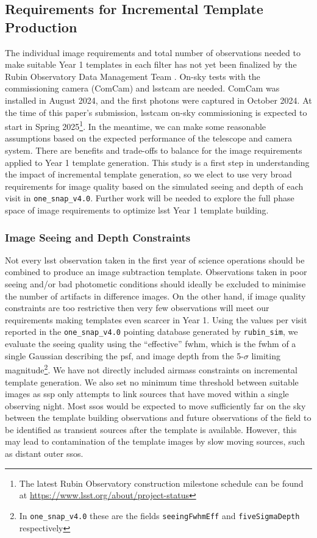 \documentclass[preprintm,linenumbers]{aastex631}
\newcommand{\baseline}{\texttt{one\_snap\_v4.0}\xspace}
\newcommand{\rubinsim}{\texttt{rubin\_sim}\xspace}
\begin{document}
	\subsection{Requirements for Incremental Template Production}
	The individual image requirements and total number of observations needed to make suitable Year 1 templates in each filter has not yet been finalized by the Rubin Observatory Data Management Team \citep{DMTN-107,RTN-011}. 
 On-sky tests with the commissioning camera (ComCam) and \gls*{lsstcam} are needed. 
 ComCam was installed in August 2024, and the first photons were captured in October 2024. 
 At the time of this paper's submission, \gls*{lsstcam} on-sky commissioning is expected to start in Spring 2025\footnote{The latest Rubin Observatory construction milestone schedule can be found at \url{https://www.lsst.org/about/project-status}}. 
 In the meantime, we can make some reasonable assumptions based on the expected performance of the telescope and camera system. 
 There are benefits and trade-offs to balance for the image requirements applied to Year 1 template generation. This study is a first step in understanding the impact of incremental template generation,  so we elect to use very broad requirements for image quality based on the simulated seeing and depth of each visit in \baseline. 
 Further work will be needed to explore the full phase space of image requirements to optimize \gls*{lsst} Year 1 template building. 
	
	\subsubsection{Image Seeing and Depth Constraints}
	\label{sec:imageqa}
	Not every \gls*{lsst} observation taken in the first year of science operations should be combined to produce an image subtraction template. 
 Observations taken in  poor seeing and/or bad photometic conditions should ideally be excluded to minimise the number of artifacts in difference images. 
	On the other hand, if image quality constraints are too restrictive then very few observations will meet our requirements making templates even scarcer in Year 1.  
	Using the values per visit reported in the \baseline pointing database generated by \rubinsim, we evaluate the seeing quality using the ``effective” \gls*{fwhm}, which is the \gls*{fwhm} of a single Gaussian describing the \gls*{psf}, and image depth from the 5-$\sigma$ limiting magnitude\footnote{In \baseline these are the fields \texttt{seeingFwhmEff} and \texttt{fiveSigmaDepth} respectively}. 
	We have not directly included airmass constraints on incremental template generation. 
 We also set no minimum time threshold between suitable images as \gls*{ssp} only attempts to link sources that have moved within a single observing night. Most \glspl*{sso} would be expected to move sufficiently far on the sky between the template building observations and future observations of the field to be identified as transient sources after the template is available.
 However, this may lead to contamination of the template images by slow moving sources, such as distant outer \glspl*{sso}.
	
\end{document}
